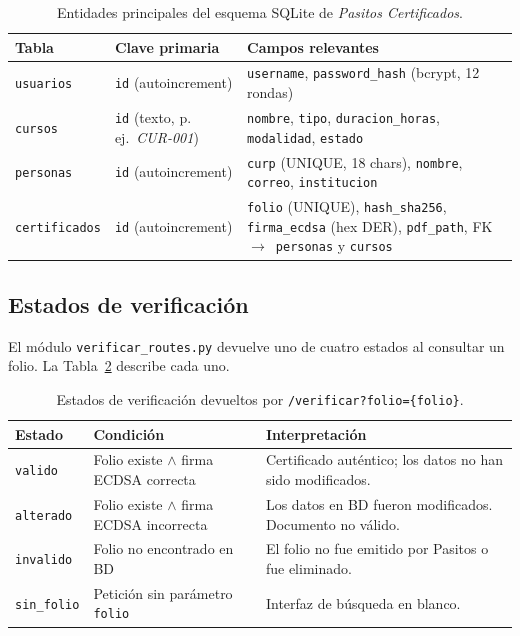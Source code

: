 \documentclass[11pt,letterpaper]{article}
\begin{document}
\begin{table}[H]
  \centering
  \caption{Entidades principales del esquema SQLite de \textit{Pasitos Certificados}.}
  \label{tab:schema}
  \begin{tabularx}{\textwidth}{llX}
    \toprule
    \textbf{Tabla} & \textbf{Clave primaria} & \textbf{Campos relevantes} \\
    \midrule
    \texttt{usuarios}     & \texttt{id} (autoincrement) &
      \texttt{username}, \texttt{password\_hash} (bcrypt, 12 rondas) \\[4pt]
    \texttt{cursos}       & \texttt{id} (texto, p.\,ej.\ \textit{CUR-001}) &
      \texttt{nombre}, \texttt{tipo}, \texttt{duracion\_horas},
      \texttt{modalidad}, \texttt{estado} \\[4pt]
    \texttt{personas}     & \texttt{id} (autoincrement) &
      \texttt{curp} (UNIQUE, 18 chars), \texttt{nombre}, \texttt{correo},
      \texttt{institucion} \\[4pt]
    \texttt{certificados} & \texttt{id} (autoincrement) &
      \texttt{folio} (UNIQUE), \texttt{hash\_sha256}, \texttt{firma\_ecdsa}
      (hex DER), \texttt{pdf\_path},
      FK~$\to$~\texttt{personas} y \texttt{cursos} \\
    \bottomrule
  \end{tabularx}
\end{table}

\subsection{Estados de verificaci\'on}

El m\'odulo \texttt{verificar\_routes.py} devuelve uno de cuatro estados al consultar
un folio. La Tabla~\ref{tab:estados} describe cada uno.

\begin{table}[H]
  \centering
  \caption{Estados de verificaci\'on devueltos por
           \texttt{/verificar?folio=\{folio\}}.}
  \label{tab:estados}
  \begin{tabular}{llp{7cm}}
    \toprule
    \textbf{Estado}     & \textbf{Condici\'on}                         &
    \textbf{Interpretaci\'on} \\
    \midrule
    \texttt{valido}     & Folio existe $\wedge$ firma ECDSA correcta   &
      Certificado aut\'entico; los datos no han sido modificados. \\[4pt]
    \texttt{alterado}   & Folio existe $\wedge$ firma ECDSA incorrecta &
      Los datos en BD fueron modificados. Documento no v\'alido. \\[4pt]
    \texttt{invalido}   & Folio no encontrado en BD                    &
      El folio no fue emitido por Pasitos o fue eliminado. \\[4pt]
    \texttt{sin\_folio} & Petici\'on sin par\'ametro \texttt{folio}    &
      Interfaz de b\'usqueda en blanco. \\
    \bottomrule
  \end{tabular}
\end{table}
\end{document}
